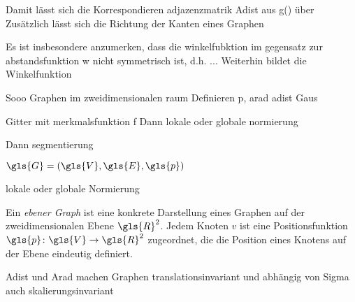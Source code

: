 Damit lässt sich die Korrespondieren adjazenzmatrik Adist aus g() über
Zusätzlich lässt sich die Richtung der Kanten eines Graphen

Es ist insbesondere anzumerken, dass die winkelfubktion im gegensatz zur abstandsfunktion w nicht symmetrisch ist, d.h. ...
Weiterhin bildet die Winkelfunktion



Sooo
Graphen im zweidimensionalen raum
Definieren p, arad adist
Gaus

Gitter mit merkmalsfunktion f
Dann lokale oder globale normierung

Dann segmentierung


$\gls{G} = \left(\gls{V}, \gls{E}, \gls{p}\right)$

lokale oder globale Normierung

Ein \emph{ebener Graph} ist eine konkrete Darstellung eines Graphen auf der zweidimensionalen Ebene $\gls{R}^2$.
Jedem Knoten $v$ ist eine Positionsfunktion $\gls{p} \colon \gls{V} \to \gls{R}^2$ zugeordnet, die die Position eines Knotens auf der Ebene eindeutig definiert.

\gls{Adist} und \gls{Arad} machen Graphen translationsinvariant und abhängig von Sigma auch skalierungsinvariant




